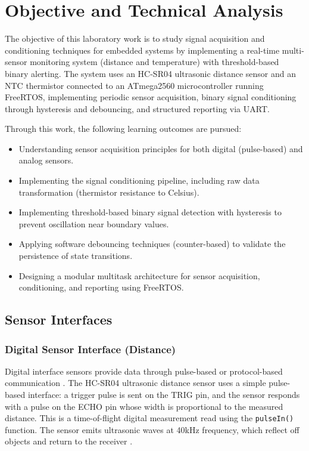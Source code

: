 ﻿\newpage

\tableofcontents

\newpage

\section{Objective and Technical Analysis}

The objective of this laboratory work is to study signal acquisition and conditioning techniques for embedded systems by implementing a real-time multi-sensor monitoring system (distance and temperature) with threshold-based binary alerting. The system uses an HC-SR04 ultrasonic distance sensor and an NTC thermistor connected to an ATmega2560 microcontroller running FreeRTOS, implementing periodic sensor acquisition, binary signal conditioning through hysteresis and debouncing, and structured reporting via UART.

Through this work, the following learning outcomes are pursued:
\begin{itemize}
    \item Understanding sensor acquisition principles for both digital (pulse-based) and analog sensors.
    \item Implementing the signal conditioning pipeline, including raw data transformation (thermistor resistance to Celsius).
    \item Implementing threshold-based binary signal detection with hysteresis to prevent oscillation near boundary values.
    \item Applying software debouncing techniques (counter-based) to validate the persistence of state transitions.
    \item Designing a modular multitask architecture for sensor acquisition, conditioning, and reporting using FreeRTOS.
\end{itemize}

\subsection{Sensor Interfaces}

\subsubsection{Digital Sensor Interface (Distance)}
Digital interface sensors provide data through pulse-based or protocol-based communication \cite{sensor_interfaces}. The HC-SR04 ultrasonic distance sensor uses a simple pulse-based interface: a trigger pulse is sent on the TRIG pin, and the sensor responds with a pulse on the ECHO pin whose width is proportional to the measured distance. This is a time-of-flight digital measurement read using the \texttt{pulseIn()} function. The sensor emits ultrasonic waves at 40kHz frequency, which reflect off objects and return to the receiver \cite{ultrasonic_principles}.


